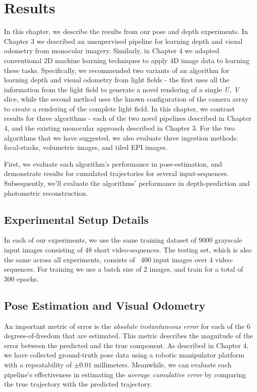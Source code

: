 

\chapter{Results}

In this chapter, we describe the results from our pose and depth experiments. In Chapter 3 we described an unsupervised pipeline for learning depth and visual odometry from monocular imagery. Similarly, in Chapter 4 we adapted conventional 2D machine learning techniques to apply 4D image data to learning these tasks. Specifically, we recommended two variants of an algorithm for learning depth and visual odometry from light fields - the first uses all the information from the light field to generate a novel rendering of a single \textit{U, V} slice, while the second method uses the known configuration of the camera array to create a rendering of the complete light field. In this chapter, we contrast results for three algorithms - each of the two novel pipelines described in Chapter 4, and the existing monocular approach described in Chapter 3. For the two algorithms that we have suggested, we also evaluate three ingestion methods: focal-stacks, volumetric images, and tiled EPI images. 

First, we evaluate each algorithm's performance in pose-estimation, and demonstrate results for cumulated trajectories for several input-sequences. Subsequently, we'll evaluate the algorithms' performance in depth-prediction and photometric reconstruction. 


\section{Experimental Setup Details}
In each of our experiments, we use the same training dataset of 9000 grayscale input images consisting of 48 short video-sequences. The testing set, which is also the same across all experiments, consists of ~400 input images over 4 video-sequences. For training we use a batch size of 2 images, and train for a total of 300 epochs. 


\section{Pose Estimation and Visual Odometry}

An important metric of error is the \textit{absolute instantaneous error} for each of the 6 degrees-of-freedom that are estimated. This metric describes the magnitude of the error between the predicted and the true component. As described in Chapter 4, we have collected ground-truth pose data using a robotic manipulator platform with a repeatability of $\pm 0.01$ millimeters. Meanwhile, we can evaluate each pipeline's effectiveness in estimating the \textit{average cumulative error} by comparing the true trajectory with the predicted trajectory. 

